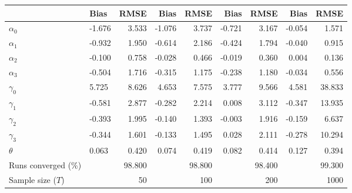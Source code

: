 
\begin{tabular}[t]{llrrrrrrr}
\toprule
  & Bias & RMSE & Bias & RMSE & Bias & RMSE & Bias & RMSE\\
\midrule
$\alpha_{0}$ & -1.676 & 3.533 & -1.076 & 3.737 & -0.721 & 3.167 & -0.054 & 1.571\\
$\alpha_{1}$ & -0.932 & 1.950 & -0.614 & 2.186 & -0.424 & 1.794 & -0.040 & 0.915\\
$\alpha_{2}$ & -0.100 & 0.758 & -0.028 & 0.466 & -0.019 & 0.360 & 0.004 & 0.136\\
$\alpha_{3}$ & -0.504 & 1.716 & -0.315 & 1.175 & -0.238 & 1.180 & -0.034 & 0.556\\
$\gamma_{0}$ & 5.725 & 8.626 & 4.653 & 7.575 & 3.777 & 9.566 & 4.581 & 38.833\\
$\gamma_{1}$ & -0.581 & 2.877 & -0.282 & 2.214 & 0.008 & 3.112 & -0.347 & 13.935\\
$\gamma_{2}$ & -0.393 & 1.995 & -0.140 & 1.393 & -0.003 & 1.916 & -0.159 & 6.637\\
$\gamma_{3}$ & -0.344 & 1.601 & -0.133 & 1.495 & 0.028 & 2.111 & -0.278 & 10.294\\
$\theta$ & 0.063 & 0.420 & 0.074 & 0.419 & 0.082 & 0.414 & 0.127 & 0.394\\
Runs converged (\%) &  & 98.800 &  & 98.800 &  & 98.400 &  & 99.300\\
Sample size ($T$) &  & 50 &  & 100 &  & 200 &  & 1000\\
\bottomrule
\end{tabular}
